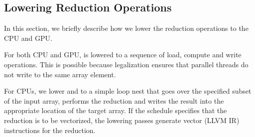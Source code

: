   

\subsection{Lowering Reduction Operations}
In this section, we briefly describe 
how we lower the reduction operations to the CPU and GPU. 

For both CPU and GPU,  is lowered to a sequence 
of load, compute and write operations. This is possible because 
legalization ensures that parallel threads do not write to the same 
array element. 

For CPUs, we lower  and 
 to a simple loop nest that goes over the specified
subset of the input array, performs the reduction and writes 
the result into the appropriate location of the target array. 
If the schedule specifies that the reduction is to be vectorized,
the lowering passes generate vector (LLVM IR) instructions for 
the reduction.



